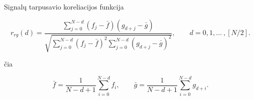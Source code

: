 Signalų tarpusavio koreliacijos funkcija

\begin{equation}
    r_{rg} (d) = \dfrac{\displaystyle \sum\limits_{j=0}^{N-d} {(f_j - \bar{f}) (g_{d+j} - \bar{g})}} {\sqrt{\displaystyle \sum\limits_{j=0}^{N-d} (f_j - \bar{f})^2 \displaystyle \sum\limits_{j=0}^{N-d} (g_{d+j} - \bar{g})^2}},\qquad
    d = 0,1,\ldots\ ,[N/2].
\end{equation}

čia

\begin{equation}
    \bar{f} = \dfrac{1} {N-d+1} \displaystyle \sum\limits_{i=0}^{N-d} {f_i},\qquad
    \bar{g} = \dfrac{1} {N-d+1} \displaystyle \sum\limits_{i=0}^{N-d} {g_{d+i}}.
\end{equation}
